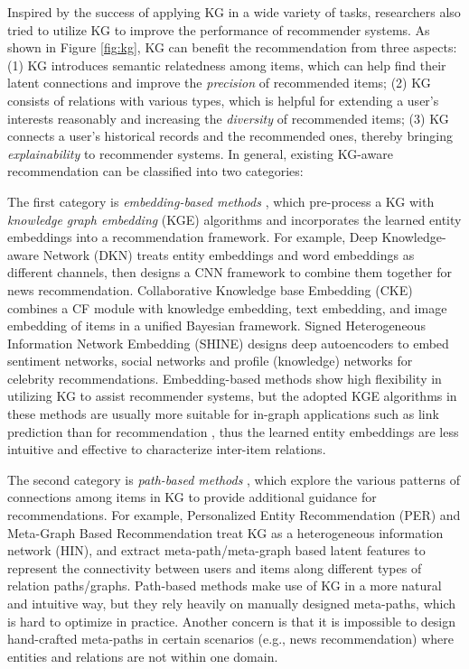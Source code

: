 \documentclass[sigconf]{acmart}
\begin{document}
	Inspired by the success of applying KG in a wide variety of tasks, researchers also tried to utilize KG to improve the performance of recommender systems.
	As shown in Figure \ref{fig:kg}, KG can benefit the recommendation from three aspects:
	(1) KG introduces semantic relatedness among items, which can help find their latent connections and improve the \textit{precision} of recommended items;
	(2) KG consists of relations with various types, which is helpful for extending a user's interests reasonably and increasing the \textit{diversity} of recommended items;
	(3) KG connects a user's historical records and the recommended ones, thereby bringing \textit{explainability} to recommender systems.
	In general, existing KG-aware recommendation can be classified into two categories:
	
	The first category is \textit{embedding-based methods} \cite{wang2018dkn,zhang2016collaborative,wang2018shine}, which pre-process a KG with \textit{knowledge graph embedding} (KGE) \cite{wang2017knowledge} algorithms and incorporates the learned entity embeddings into a recommendation framework.
	For example, Deep Knowledge-aware Network (DKN) \cite{wang2018dkn} treats entity embeddings and word embeddings as different channels, then designs a CNN framework to combine them together for news recommendation.
	Collaborative Knowledge base Embedding (CKE) \cite{zhang2016collaborative} combines a CF module with knowledge embedding, text embedding, and image embedding of items in a unified Bayesian framework.
	Signed Heterogeneous Information Network Embedding (SHINE) \cite{wang2018shine} designs deep autoencoders to embed sentiment networks, social networks and profile (knowledge) networks for celebrity recommendations.
	Embedding-based methods show high flexibility in utilizing KG to assist recommender systems, but the adopted KGE algorithms in these methods are usually more suitable for in-graph applications such as link prediction than for recommendation \cite{wang2017knowledge}, thus the learned entity embeddings are less intuitive and effective to characterize inter-item relations.
	
	The second category is \textit{path-based methods} \cite{yu2014personalized,zhao2017meta}, which explore the various patterns of connections among items in KG to provide additional guidance for recommendations.	
	For example, Personalized Entity Recommendation (PER) \cite{yu2014personalized} and Meta-Graph Based Recommendation \cite{zhao2017meta} treat KG as a heterogeneous information network (HIN), and extract meta-path/meta-graph based latent features to represent the connectivity between users and items along different types of relation paths/graphs.
	Path-based methods make use of KG in a more natural and intuitive way, but they rely heavily on manually designed meta-paths, which is hard to optimize in practice.
	Another concern is that it is impossible to design hand-crafted meta-paths in certain scenarios (e.g., news recommendation) where entities and relations are not within one domain.
	
\end{document}
